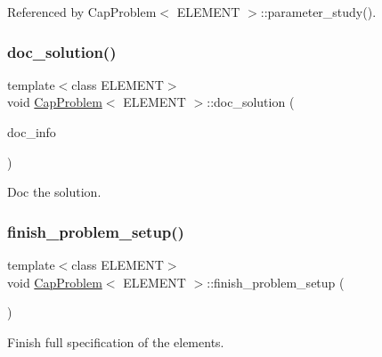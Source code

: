 Referenced by Cap\+Problem$<$ E\+L\+E\+M\+E\+N\+T $>$\+::parameter\+\_\+study().

\mbox{\label{classCapProblem_a8549ca722d2d151ebf3ef7b35b925fbb}} 
\subsubsection{\texorpdfstring{doc\+\_\+solution()}{doc\_solution()}\hspace{0.1cm}{\footnotesize\ttfamily [2/2]}}
{\footnotesize\ttfamily template$<$class E\+L\+E\+M\+E\+NT$>$ \\
void \hyperlink{classCapProblem}{Cap\+Problem}$<$ E\+L\+E\+M\+E\+NT $>$\+::doc\+\_\+solution (\begin{DoxyParamCaption}\item[{Doc\+Info \&}]{doc\+\_\+info }\end{DoxyParamCaption})}



Doc the solution. 

\mbox{\label{classCapProblem_a5dab5b1ae1d41cb23ac2bcb08fb3dc22}} 
\subsubsection{\texorpdfstring{finish\+\_\+problem\+\_\+setup()}{finish\_problem\_setup()}}
{\footnotesize\ttfamily template$<$class E\+L\+E\+M\+E\+NT$>$ \\
void \hyperlink{classCapProblem}{Cap\+Problem}$<$ E\+L\+E\+M\+E\+NT $>$\+::finish\+\_\+problem\+\_\+setup (\begin{DoxyParamCaption}{ }\end{DoxyParamCaption})}



Finish full specification of the elements. 

\mbox{\label{classCapProblem_a680e8e486a229479dad687e10a5fa03a}} 
